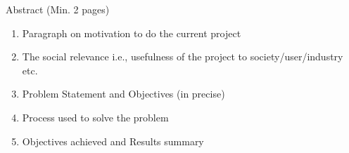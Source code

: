 \begin{abstracts}        
\normalsize{
Abstract (Min. 2 pages)
\begin{enumerate}
\item Paragraph on motivation to do the current project
\item The social relevance i.e., usefulness of the project to society/user/industry etc.
\item Problem Statement and Objectives (in precise)
\item Process used to solve the problem
\item Objectives achieved and Results summary
\end{enumerate}

}
\end{abstracts}


